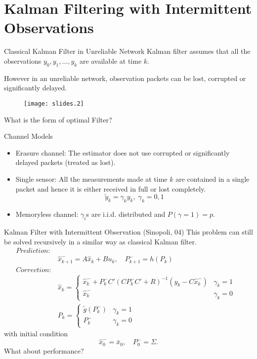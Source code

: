 \documentclass{beamer}
\begin{document}
  \section{Kalman Filtering with Intermittent Observations}
  \frame{\tableofcontents[currentsection]}

  \begin{frame}{Classical Kalman Filter in Unreliable Network}
    Kalman filter assumes that all the observations $y_0,y_1,\ldots,y_k$ are available at time $k$.

    However in an unreliable network, observation packets can be lost, corrupted or significantly delayed.
    \begin{figure}[<h>]
      \begin{center}
	\texttt{[image: slides.2]}
      \end{center}
    \end{figure}
    What is the form of optimal Filter? 
  \end{frame}

  \begin{frame}{Channel Models}  
    \begin{itemize}
      \item Erasure channel: The estimator does not use corrupted or significantly delayed packets (treated as lost). 
      \item Single sensor: All the measurements made at time $k$ are contained in a single packet and hence it is either received in full or lost completely.
	\[
	\widetilde y_k = \gamma_k y_k,\;\gamma_k=0,1
	\]
      \item Memoryless channel: $\gamma_i$s are i.i.d. distributed and $P(\gamma = 1) = p$.
    \end{itemize}
  \end{frame}

  \begin{frame}{Kalman Filter with Intermittent Observation}
    (Sinopoli, 04) This problem can still be solved recursively in a similar way as classical Kalman filter. 
    \begin{align*}
      Prediction:&&\\
      &\hat x _{k + 1}^-  = A \hat x_{k} + Bu_k  , \quad P_{k + 1}^-  = h(P_k)\\
      Correction:&&\\
      &\hat x_{k} = \begin{cases}
	\hat x_{k}^-  + P_k^- C'(CP_k^- C'+R)^{-1} (y_k  - C \hat x _{k}^- ) & \gamma_ k = 1\\ 
	\hat x_{k}^-   & \gamma_ k = 0 
      \end{cases}\\
      &P_{k} =\begin{cases}
	\tilde g(P_k^-) & \gamma_k = 1\\
	P_k^-&\gamma_k = 0
      \end{cases}
    \end{align*}
    with initial condition
    \begin{displaymath}
      \hat x_{0}^-  = \bar x_0 ,\quad P_{0}^-  = \Sigma.
    \end{displaymath}
    What about performance?

  \end{frame}
\end{document}

